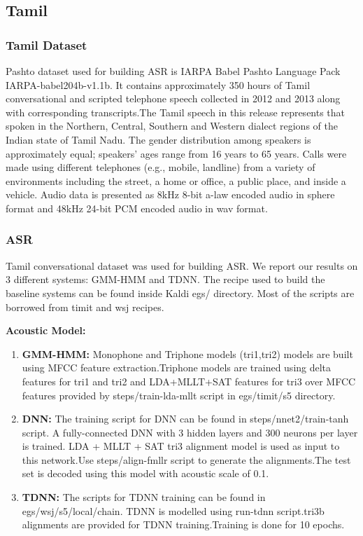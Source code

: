 \documentclass[12pt]{article}
\begin{document}
\subsection{Tamil}
\subsubsection{Tamil Dataset}
Pashto dataset used for building ASR is IARPA Babel Pashto Language Pack IARPA-babel204b-v1.1b.
It contains approximately 350 hours of Tamil conversational and scripted telephone speech collected in 2012 and 2013 along with corresponding transcripts.The Tamil speech in this release represents that spoken in the Northern, Central, Southern and Western dialect regions of the Indian state of Tamil Nadu. The gender distribution among speakers is approximately equal; speakers' ages range from 16 years to 65 years. Calls were made using different telephones (e.g., mobile, landline) from a variety of environments including the street, a home or office, a public place, and inside a vehicle.
Audio data is presented as 8kHz 8-bit a-law encoded audio in sphere format and 48kHz 24-bit PCM encoded audio in wav format.


\subsubsection{ASR}
Tamil conversational dataset was used for building ASR.
We report our results on 3 different systems: GMM-HMM and TDNN. The recipe used to build the baseline systems can be found inside Kaldi egs/ directory. Most of the scripts are borrowed from timit and wsj recipes.

\newpage
\textbf{Acoustic Model:}

\begin{enumerate}
\item {\textbf{GMM-HMM:}} Monophone and Triphone models (tri1,tri2) models are built using MFCC feature extraction.Triphone models are trained using delta features for tri1 and tri2 and LDA+MLLT+SAT features for tri3 over MFCC features provided by steps/train-lda-mllt script in egs/timit/s5 directory.

\item {\textbf{DNN:}} The training script for DNN can be found in steps/nnet2/train-tanh script. A fully-connected DNN with 3 hidden layers and 300 neurons per layer is trained.  LDA + MLLT + SAT tri3 alignment model is used as input to this network.Use steps/align-fmllr script to generate the alignments.The test set is decoded using this model with acoustic scale of 0.1.


\item \textbf{TDNN:} The scripts for TDNN training can be found in egs/wsj/s5/local/chain. TDNN is modelled using run-tdnn script.tri3b alignments are provided for TDNN training.Training is done for 10 epochs.

\end{enumerate}
\end{document}
